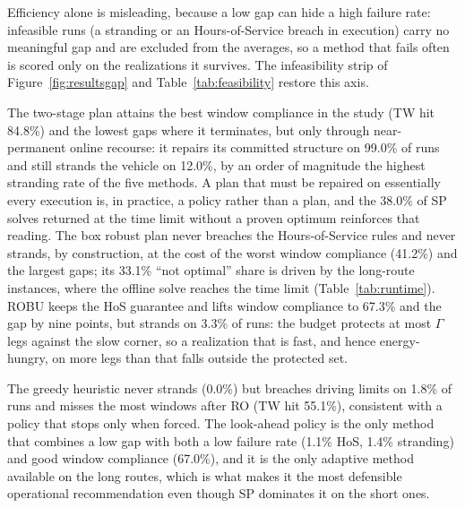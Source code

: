 Efficiency alone is misleading, because a low gap can hide a high failure rate:
infeasible runs (a stranding or an Hours-of-Service breach in execution) carry
no meaningful gap and are excluded from the averages, so a method that fails
often is scored only on the realizations it survives.  The infeasibility strip
of Figure~\ref{fig:resultsgap} and Table~\ref{tab:feasibility} restore this
axis.

The two-stage plan attains the best window compliance in the study (TW hit
84.8\%) and the lowest gaps where it terminates, but only through near-permanent
online recourse: it repairs its committed structure on 99.0\% of runs and still
strands the vehicle on 12.0\%, by an order of magnitude the highest stranding
rate of the five methods.  A plan that must be repaired on essentially every
execution is, in practice, a policy rather than a plan, and the 38.0\% of SP
solves returned at the time limit without a proven optimum reinforces that
reading.  The box robust plan never breaches the Hours-of-Service rules and
never strands, by construction, at the cost of the worst window compliance
(41.2\%) and the largest gaps; its 33.1\% ``not optimal'' share is driven by
the long-route instances, where the offline solve reaches the time limit
(Table~\ref{tab:runtime}).  ROBU keeps the HoS guarantee and lifts window
compliance to 67.3\% and the gap by nine points, but strands on 3.3\% of runs:
the budget protects at most $\Gamma$ legs against the slow corner, so a
realization that is fast, and hence energy-hungry, on more legs than that falls
outside the protected set.  

The greedy heuristic never strands (0.0\%) but breaches driving limits on 1.8\%
of runs and misses the most windows after RO (TW hit 55.1\%), consistent with a
policy that stops only when forced.  The look-ahead policy is the only method
that combines a low gap with both a low failure rate (1.1\% HoS, 1.4\%
stranding) and good window compliance (67.0\%), and it is the only adaptive
method available on the long routes, which is what makes it the most defensible
operational recommendation even though SP dominates it on the short ones.

